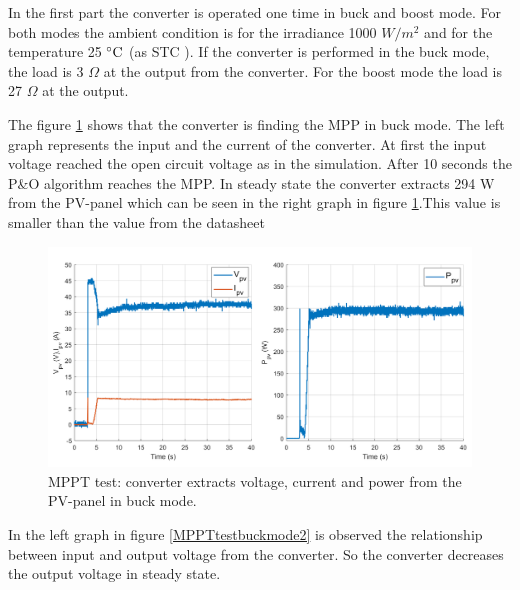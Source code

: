 In the first part the converter is operated one time in buck and boost mode. For both modes the ambient condition is for the irradiance 1000 $W /m^2$ and for the temperature 25 $\decC$ (as STC ). If the converter is performed in the buck mode, the load is 3 $\Omega$ at the output from the converter. For the boost mode the load is 27 $\Omega$ at the output.

The figure \ref{MPPTtestbuckmode1} shows that the converter is finding the MPP in buck mode. The left graph represents the input and the current of the converter. At first the input voltage reached the open circuit voltage as in the simulation.  After 10 seconds the P\&O algorithm reaches the MPP. In steady state the converter extracts 294 W from the PV-panel which can be seen in the right graph in figure \ref{MPPTtestbuckmode1}.This value is smaller than the value from the datasheet \cite{PV_panel}

\begin{figure}[H]
	\begin{center}
		\includegraphics[width=1\textwidth]{../Pictures/P1/Test/Buck_mode_MPPT_Vin_Iin_Pin}
		\caption{MPPT test: converter extracts voltage, current and power from the PV-panel in buck mode.}
		\label{MPPTtestbuckmode1}
	\end{center}	
\end{figure}

In the left graph in figure \ref{MPPTtestbuckmode2} is observed the relationship between input and output voltage from the converter. So the converter decreases the output voltage in steady state.
 
